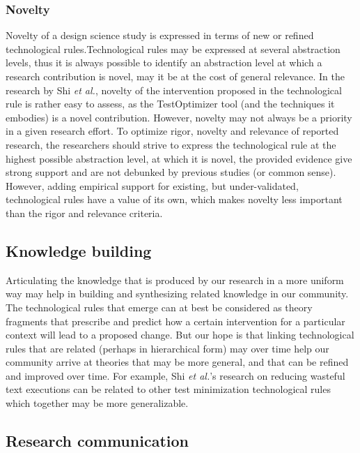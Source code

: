 \documentclass[graybox]{svmult}
\begin{document}
\subsubsection{Novelty %
} 
Novelty of a design science study is expressed in terms of new or refined technological rules.Technological rules may be expressed at several abstraction levels, thus it is always possible to identify an abstraction level at which a research contribution is novel, may it be at the cost of general relevance.  In the research by Shi \emph{et al.}, novelty of the intervention proposed in the technological rule is rather easy to assess, as the TestOptimizer tool (and the techniques it embodies) is a novel contribution.  
However, novelty may not always be a priority in a given research effort.
To optimize rigor, novelty and relevance of reported research, the researchers should strive to express the technological rule at the highest possible abstraction level, at which it is novel, the provided evidence give strong support and are not debunked by previous studies (or common sense). However, adding empirical support for existing, but under-validated, technological rules have a value of its own, which makes novelty less important than the rigor and relevance criteria.


\subsection{Knowledge building}
\label{sec:knowledge}

Articulating the knowledge that is produced by our research in a more uniform way may help in building and synthesizing related knowledge in our community. 
The technological rules that emerge can at best be considered as theory fragments that prescribe and predict how a certain intervention for a particular context will lead to a proposed change. 
But our hope is that linking technological rules that are related (perhaps in hierarchical form) may over time help our community arrive at theories that may be more general, and that can be refined and improved over time. 
For example, Shi \emph{et al.}'s research on reducing wasteful text executions can be related to other test minimization technological rules which together may be more generalizable. 

\subsection{Research communication}
\label{sec:communication}
\end{document}
